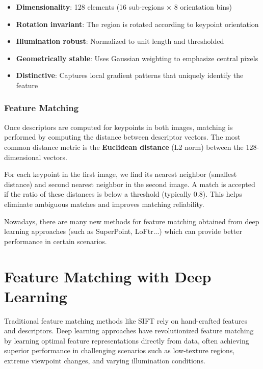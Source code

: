 \documentclass[11pt,a4paper]{article}
\theoremstyle{definition}
\theoremstyle{plain}
\theoremstyle{remark}
\begin{document}
\begin{tcolorbox}[colback=orange!5!white,colframe=orange!75!black,title=\textbf{SIFT Descriptor Properties}]
\begin{itemize}
    \item \textbf{Dimensionality}: 128 elements (16 sub-regions × 8 orientation bins)
    \item \textbf{Rotation invariant}: The region is rotated according to keypoint orientation
    \item \textbf{Illumination robust}: Normalized to unit length and thresholded
    \item \textbf{Geometrically stable}: Uses Gaussian weighting to emphasize central pixels
    \item \textbf{Distinctive}: Captures local gradient patterns that uniquely identify the feature
\end{itemize}
\end{tcolorbox}

\subsubsection{Feature Matching}

Once descriptors are computed for keypoints in both images, matching is performed by computing the distance between descriptor vectors. The most common distance metric is the \textbf{Euclidean distance} (L2 norm) between the 128-dimensional vectors.

For each keypoint in the first image, we find its nearest neighbor (smallest distance) and second nearest neighbor in the second image. A match is accepted if the ratio of 
these distances is below a threshold (typically 0.8). This helps eliminate ambiguous matches and improves matching reliability.

Nowadays, there are many new methods for feature matching obtained from deep learning approaches (such as SuperPoint, LoFtr...) which can provide better performance in certain scenarios.

\section{Feature Matching with Deep Learning}

Traditional feature matching methods like SIFT rely on hand-crafted features and descriptors. Deep learning approaches have revolutionized feature matching by learning optimal feature representations directly from data, often achieving superior performance in challenging scenarios such as low-texture regions, extreme viewpoint changes, and varying illumination conditions.
\end{document}
